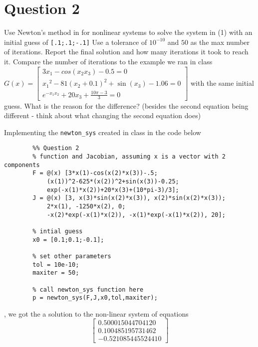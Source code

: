 \section{Question 2}

\begin{question}
    Use Newton’s method in \MATLAB for nonlinear systems to solve the system in (1) with an initial guess of \verb+[.1;.1;-.1]+ Use a tolerance of $10^{−10}$ and $50$ as the max number of iterations. Report the final solution and how many iterations it took to reach it. Compare the number of iterations to the example we ran in class $G(x) = \left[\begin{smallmatrix}3x_1 − cos(x_2x_3) − 0.5 = 0\\  {x_1}^2 −  81{(x_2+0.1)}^2 + \sin{(x_3)}− 1.06 = 0\\ e^{−x_1x_2} + 20x_3 + \tfrac{10\pi−3}{3}  = 0\end{smallmatrix}\right]$ with the same initial guess. What is the reason for the difference? (besides the second equation being different - think about what changing the second equation does)
\end{question}

\begin{answer}
    Implementing the \verb+newton_sys+ created in class in the code below 
    \begin{verbatim}
        %% Question 2
        % function and Jacobian, assuming x is a vector with 2 components
        F = @(x) [3*x(1)-cos(x(2)*x(3))-.5;
            (x(1))^2-625*(x(2))^2+sin(x(3))-0.25;
            exp(-x(1)*x(2))+20*x(3)+(10*pi-3)/3];
        J = @(x) [3, x(3)*sin(x(2)*x(3)), x(2)*sin(x(2)*x(3));
            2*x(1), -1250*x(2), 0;
            -x(2)*exp(-x(1)*x(2)), -x(1)*exp(-x(1)*x(2)), 20];
        
        % intial guess
        x0 = [0.1;0.1;-0.1];
        
        % set other parameters
        tol = 10e-10;
        maxiter = 50;
        
        % call newton_sys function here
        p = newton_sys(F,J,x0,tol,maxiter);
    \end{verbatim}
    , we got the a solution to the non-linear system of equations
    \begin{equation}
        \left[\begin{matrix}
            0.500015044704120\\
            0.100485195731462\\
            -0.521085445524410
        \end{matrix}\right]
    \end{equation}
\end{answer}